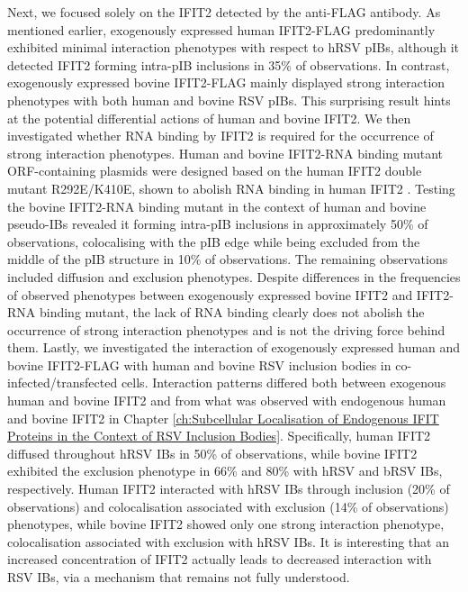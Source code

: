 Next, we focused solely on the IFIT2 detected by the anti-FLAG antibody. As mentioned earlier, exogenously expressed human IFIT2-FLAG predominantly exhibited minimal interaction phenotypes with respect to hRSV pIBs, although it detected IFIT2 forming intra-pIB inclusions in 35\% of observations. In contrast, exogenously expressed bovine IFIT2-FLAG mainly displayed strong interaction phenotypes with both human and bovine RSV pIBs. This surprising result hints at the potential differential actions of human and bovine IFIT2. We then investigated whether RNA binding by IFIT2 is required for the occurrence of strong interaction phenotypes. Human and bovine IFIT2-RNA binding mutant ORF-containing plasmids were designed based on the human IFIT2 double mutant R292E/K410E, shown to abolish RNA binding in human IFIT2 \cite{Yang2012CrystalMechanisms}. Testing the bovine IFIT2-RNA binding mutant in the context of human and bovine pseudo-IBs revealed it forming intra-pIB inclusions in approximately 50\% of observations, colocalising with the pIB edge while being excluded from the middle of the pIB structure in 10\% of observations. The remaining observations included diffusion and exclusion phenotypes. Despite differences in the frequencies of observed phenotypes between exogenously expressed bovine IFIT2 and IFIT2-RNA binding mutant, the lack of RNA binding clearly does not abolish the occurrence of strong interaction phenotypes and is not the driving force behind them. Lastly, we investigated the interaction of exogenously expressed human and bovine IFIT2-FLAG with human and bovine RSV inclusion bodies in co-infected/transfected cells. Interaction patterns differed both between exogenous human and bovine IFIT2 and from what was observed with endogenous human and bovine IFIT2 in Chapter \ref{ch:Subcellular Localisation of Endogenous IFIT Proteins in the Context of RSV Inclusion Bodies}. Specifically, human IFIT2 diffused throughout hRSV IBs in 50\% of observations, while bovine IFIT2 exhibited the exclusion phenotype in 66\% and 80\% with hRSV and bRSV IBs, respectively. Human IFIT2 interacted with hRSV IBs through inclusion (20\% of observations) and colocalisation associated with exclusion (14\% of observations) phenotypes, while bovine IFIT2 showed only one strong interaction phenotype, colocalisation associated with exclusion with hRSV IBs. It is interesting that an increased concentration of IFIT2 actually leads to decreased interaction with RSV IBs, via a mechanism that remains not fully understood.

